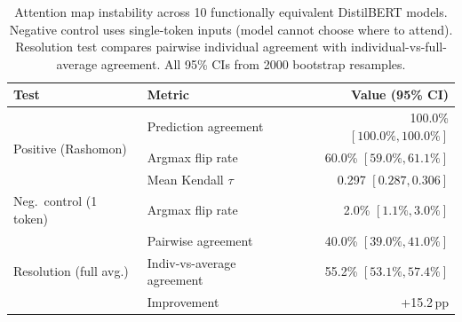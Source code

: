 \begin{table}[t]
\centering
\caption{Attention map instability across 10 functionally equivalent DistilBERT models.
  Negative control uses single-token inputs (model cannot choose where to attend).
  Resolution test compares pairwise individual agreement with individual-vs-full-average agreement.
  All 95\% CIs from 2000 bootstrap resamples.}
\label{tab:attention}
\begin{tabular}{llr}
\toprule
Test & Metric & Value (95\% CI) \\
\midrule
\multirow{3}{*}{Positive (Rashomon)} &
  Prediction agreement & 100.0\% $[100.0\%, 100.0\%]$ \\
& Argmax flip rate & 60.0\% $[59.0\%, 61.1\%]$ \\
& Mean Kendall $\tau$ & 0.297 $[0.287, 0.306]$ \\
\midrule
Neg.\ control (1 token) &
  Argmax flip rate & 2.0\% $[1.1\%, 3.0\%]$ \\
\midrule
\multirow{3}{*}{Resolution (full avg.)} &
  Pairwise agreement & 40.0\% $[39.0\%, 41.0\%]$ \\
& Indiv-vs-average agreement & 55.2\% $[53.1\%, 57.4\%]$ \\
& Improvement & +15.2\,pp \\
\bottomrule
\end{tabular}
\end{table}
